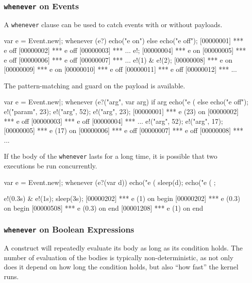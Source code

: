 \subsubsection{\lstinline{whenever} on Events}

A \lstinline{whenever} clause can be used to catch events with or
without payloads.

\begin{urbiunchecked}[firstnumber=1]
var e = Event.new|;
whenever (e?)
  echo("e on")
else
  echo("e off");
[00000001] *** e off
[00000002] *** e off
[00000003] *** ...
e!;
[00000004] *** e on
[00000005] *** e off
[00000006] *** e off
[00000007] *** ...
e!(1) & e!(2);
[00000008] *** e on
[00000009] *** e on
[00000010] *** e off
[00000011] *** e off
[00000012] *** ...
\end{urbiunchecked}

The pattern-matching and guard on the payload is available.

\begin{urbiunchecked}[firstnumber=1]
var e = Event.new|;
whenever (e?("arg", var arg) if arg %
  echo("e (%
else
  echo("e off");
e!("param", 23);
e!("arg", 52);
e!("arg", 23);
[00000001] *** e (23) on
[00000002] *** e off
[00000003] *** e off
[00000004] *** ...
e!("arg", 52);
e!("arg", 17);
[00000005] *** e (17) on
[00000006] *** e off
[00000007] *** e off
[00000008] *** ...
\end{urbiunchecked}


If the body of the \lstinline{whenever} lasts for a long time, it is
possible that two executions be run concurrently.

\begin{urbiscript}[firstnumber=1]
var e = Event.new|;
whenever (e?(var d))
{
  echo("e (%
  sleep(d);
  echo("e (%
};

e!(0.3s) & e!(1s);
sleep(3s);
[00000202] *** e (1) on begin
[00000202] *** e (0.3) on begin
[00000508] *** e (0.3) on end
[00001208] *** e (1) on end
\end{urbiscript}

\subsubsection{\lstinline{whenever} on Boolean Expressions}

A  construct will repeatedly evaluate its body as long as
its condition holds.  The number of evaluation of the bodies is typically
non-deterministic, as not only does it depend on how long the condition
holds, but also ``how fast'' the \urbi kernel runs.

